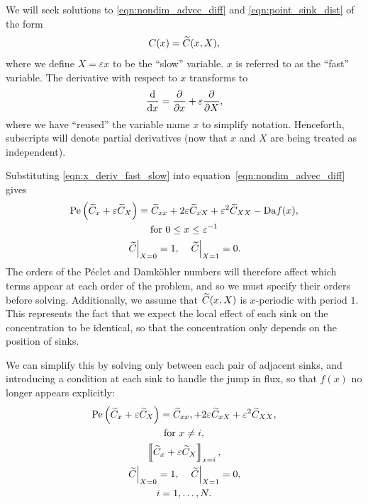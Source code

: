 We will seek solutions to \eqref{eqn:nondim_advec_diff} and
\eqref{eqn:point_sink_dist} of the form
\begin{equation}
    \label{eqn:C(x,X)}
    C(x) = \widetilde{C}(x,X),
\end{equation}
where we define \(X = \varepsilon x\) to be the ``slow'' variable. \(x\) is
referred to as the ``fast'' variable. The derivative with respect to \(x\)
transforms to
\begin{equation}
    \label{eqn:x_deriv_fast_slow}
    \frac{\mathrm{d} }{\mathrm{d} x} = \frac{\partial }{\partial x} + \varepsilon\frac{\partial }{\partial X},
\end{equation}
where we have ``reused'' the variable name \(x\) to simplify notation.
Henceforth, subscripts will denote partial derivatives (now that \(x\)
and \(X\) are being treated as independent).

Substituting \eqref{eqn:x_deriv_fast_slow} into
equation~\eqref{eqn:nondim_advec_diff} gives
\begin{subequations}
    \label{eqn:nondim_advec_diff_x_X}
    \begin{gather}
        \label{eqn:nondim_advec_diff_eq_x_X}
        \mathrm{Pe}\left(\widetilde{C}_x + \varepsilon\widetilde{C}_X\right) = \widetilde{C}_{xx}
        + 2\varepsilon\widetilde{C}_{xX} + \varepsilon^2\widetilde{C}_{XX} - \mathrm{Da} f(x),\\
        \nonumber \text{for } 0 \le x \le \varepsilon^{-1}\\
        \label{eqn:nondim_advec_diff_bcs_x_X}
        \left.\widetilde{C}\right|_{X=0} = 1, \quad \left.\widetilde{C}\right|_{X=1} = 0.
    \end{gather}
\end{subequations}
The orders of the Péclet and Damköhler numbers will therefore affect which terms
appear at each order of the problem, and so we must specify their orders before
solving. Additionally, we assume that \(\widetilde{C}(x,X)\) is \(x\)-periodic with
period \(1\). This represents the fact that we expect the local effect of each
sink on the concentration to be identical, so that the concentration only
depends on the position of sinks.

We can simplify this by solving only between each pair of adjacent sinks, and
introducing a condition at each sink to handle the jump in flux, so that
\(f(x)\) no longer appears explicitly:
\begin{subequations}
    \label{eqn:nondim_advec_diff_eq_x_X_no_f}
    \begin{gather}
        \mathrm{Pe}\left(\widetilde{C}_x + \varepsilon\widetilde{C}_X\right) = \widetilde{C}_{xx},
        + 2\varepsilon\widetilde{C}_{xX} + \varepsilon^2\widetilde{C}_{XX},\\
        \nonumber \text{for } x \ne i,\\
        \left\llbracket \widetilde{C}_x + \varepsilon \widetilde{C}_X \right\rrbracket_{x=i},\\
        \left.\widetilde{C}\right|_{X=0} = 1, \quad \left.\widetilde{C}\right|_{X=1} = 0,\\
        \nonumber i = 1, \dotsc, N.
    \end{gather}
\end{subequations}

